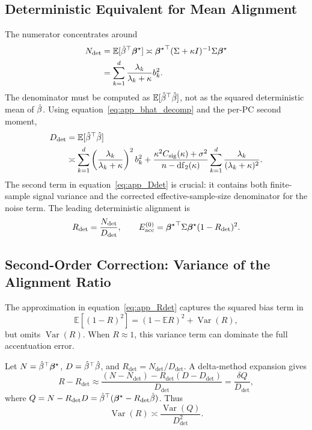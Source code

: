 \subsection{Deterministic Equivalent for Mean Alignment}

The numerator concentrates around
\begin{align}
    N_{\det}
    &=
    \mathbb{E}[\hat{\beta}^\top\boldsymbol{\beta}^{\star}]
    \asymp
    {\boldsymbol{\beta}^{\star}}^{\top}(\Sigma+\kappa I)^{-1}\Sigma\boldsymbol{\beta}^{\star} \\
    &=
    \sum_{k=1}^{d}
    \frac{\lambda_k}{\lambda_k+\kappa}b_k^2.
    \label{eq:app_Ndet}
\end{align}
The denominator must be computed as $\mathbb{E}[\hat{\beta}^\top\hat{\beta}]$, not as the squared deterministic mean of $\hat{\beta}$. Using equation~\eqref{eq:app_bhat_decomp} and the per-PC second moment,
\begin{align}
    D_{\det}
    &=
    \mathbb{E}[\hat{\beta}^\top\hat{\beta}]\\
    &\asymp
    \sum_{k=1}^{d}
    \left(\frac{\lambda_k}{\lambda_k+\kappa}\right)^2 b_k^2
    +
    \frac{\kappa^2 C_{\mathrm{sig}}(\kappa)+\sigma^2}{n-\mathrm{df}_{2}(\kappa)}
    \sum_{k=1}^{d}
    \frac{\lambda_k}{(\lambda_k+\kappa)^2}.
    \label{eq:app_Ddet}
\end{align}
The second term in equation~\eqref{eq:app_Ddet} is crucial: it contains both finite-sample signal variance and the corrected effective-sample-size denominator for the noise term. The leading deterministic alignment is
\begin{equation}
    R_{\det}=\frac{N_{\det}}{D_{\det}},
    \qquad
    E_{\mathrm{acc}}^{(0)}
    =
    {\boldsymbol{\beta}^{\star}}^{\top}\Sigma\boldsymbol{\beta}^{\star}(1-R_{\det})^2.
    \label{eq:app_Rdet}
\end{equation}

\subsection{Second-Order Correction: Variance of the Alignment Ratio}

The approximation in equation~\eqref{eq:app_Rdet} captures the squared bias term in
\begin{equation}
    \mathbb{E}[(1-R)^2]=(1-\mathbb{E}R)^2+\operatorname{Var}(R),
\end{equation}
but omits $\operatorname{Var}(R)$. When $R\approx 1$, this variance term can dominate the full accentuation error.

Let $N=\hat{\beta}^\top\boldsymbol{\beta}^{\star}$, $D=\hat{\beta}^\top\hat{\beta}$, and $R_{\det}=N_{\det}/D_{\det}$. A delta-method expansion gives
\begin{equation}
    R-R_{\det}
    \approx
    \frac{(N-N_{\det})-R_{\det}(D-D_{\det})}{D_{\det}}
    =
    \frac{\delta Q}{D_{\det}},
\end{equation}
where $Q=N-R_{\det}D=\hat{\beta}^\top(\boldsymbol{\beta}^{\star}-R_{\det}\hat{\beta})$. Thus
\begin{equation}
    \operatorname{Var}(R)
    \asymp
    \frac{\operatorname{Var}(Q)}{D_{\det}^2}.
    \label{eq:app_varR_Q}
\end{equation}

